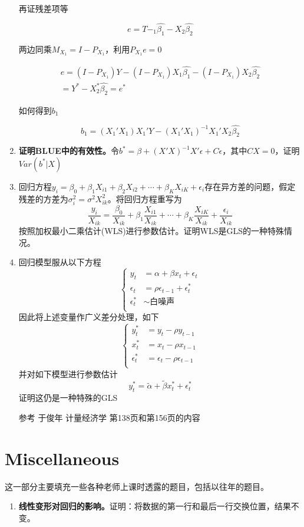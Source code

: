 \documentclass{article}
\begin{document}
\begin{enumerate}
        再证残差项等
        
        $$
          e = T - _1\widehat{\beta_1}-X_2\widehat{\beta_2}
        $$
        
        两边同乘$M_{X_1} = I-P_{X_1}$，利用$P_{X_1}e=0$
        
        $$
          \begin{aligned}
            e = (I-P_{X_1})Y-(I-P_{X_1})X_1\widehat{\beta_1} - (I-P_{X_1})X_2\widehat{\beta_2} \\
            = Y^* - X_2^*\widehat{\beta_2}=e^*
          \end{aligned}
        $$
        
        如何得到$b_1$
        
        $$
          b_1 = (X_1'X_1)X_1'Y-(X_1'X_1)^{-1}X_1'X_2\widehat{\beta_2}
        $$

    \item \textbf{证明BLUE中的有效性。}令$b^{*}=\beta+(X'X)^{-1}X'\epsilon+C\epsilon$，其中$CX=0$，证明$Var(b^*|X)$

    \item 回归方程$y_i=\beta_0+\beta_1X_{i1}+\beta_2X_{i2}+\cdots+\beta_KX_{iK}+\epsilon_i$存在异方差的问题，假定残差的方差为$\sigma_i^2=\sigma^2X_{ik}^2$。将回归方程重写为
    $$
      \frac{y_i}{X_{ik}}=\frac{\beta_0}{X_{ik}}+\beta_1\frac{X_{i1}}{X_{ik}}+\cdots+\beta_K\frac{X_{iK}}{X_{ik}}+\frac{\epsilon_i}{X_{ik}}
    $$
    按照加权最小二乘估计(WLS)进行参数估计。证明WLS是GLS的一种特殊情况。

    \item 回归模型服从以下方程
    $$
    \left\{
      \begin{aligned}
        y_t&=\alpha+\beta x_t+\epsilon_t \\
        \epsilon_t&=\rho \epsilon_{t-1}+\epsilon_t^{*} \\
        \epsilon_t^{*} &\sim \text{白噪声}\\
      \end{aligned}
    \right.
    $$
    因此将上述变量作广义差分处理，如下
    $$
    \left\{
      \begin{aligned}
        y_t^* &= y_t-\rho y_{t-1} \\
        x_t^* &= x_t-\rho x_{t-1}  \\
        \epsilon_t^* &= \epsilon_t-\rho \epsilon_{t-1} \\
      \end{aligned}
    \right.
    $$
    并对如下模型进行参数估计
    $$
      y_t^* = \widetilde{\alpha}+\widetilde{\beta}x_t^*+\epsilon_t^*
    $$
    证明这仍是一种特殊的GLS

    参考 于俊年 计量经济学 第138页和第156页的内容
\end{enumerate}

\section*{Miscellaneous}

这一部分主要填充一些各种老师上课时透露的题目，包括以往年的题目。

\begin{enumerate}
    \item \textbf{线性变形对回归的影响。}证明：将数据的第一行和最后一行交换位置，结果不变。
\end{enumerate}
\end{document}
